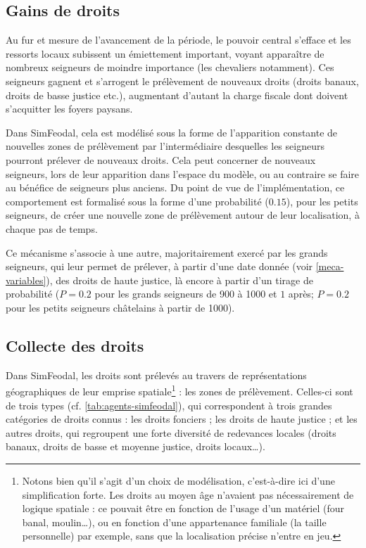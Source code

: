 \subsection{Gains de droits}

Au fur et mesure de l'avancement de la période, le pouvoir central s'efface et les ressorts locaux subissent un émiettement important, voyant apparaître de nombreux seigneurs de moindre importance (les chevaliers notamment).
Ces seigneurs gagnent et s'arrogent le prélèvement de nouveaux droits (droits banaux, droits de basse justice etc.), augmentant d'autant la charge fiscale dont doivent s'acquitter les foyers paysans.

Dans SimFeodal, cela est modélisé sous la forme de l'apparition constante de nouvelles zones de prélèvement par l'intermédiaire desquelles les seigneurs pourront prélever de nouveaux droits.
Cela peut concerner de nouveaux seigneurs, lors de leur apparition dans l'espace du modèle, ou au contraire se faire au bénéfice de seigneurs plus anciens.
Du point de vue de l'implémentation, ce comportement est formalisé sous la forme d'une probabilité ($0.15$), pour les petits seigneurs, de créer une nouvelle zone de prélèvement autour de leur localisation, à chaque pas de temps.

Ce mécanisme s'associe à une autre, majoritairement exercé par les grands seigneurs, qui leur permet de prélever, à partir d'une date donnée (voir \cref{meca-variables}), des droits de haute justice, là encore à partir d'un tirage de probabilité ($P = 0.2$ pour les grands seigneurs de 900 à 1000 et $1$ après; $P = 0.2$ pour les petits seigneurs châtelains à partir de 1000).

\subsection{Collecte des droits}

Dans SimFeodal, les droits sont prélevés au travers de représentations géographiques de leur emprise spatiale\footnote{
Notons bien qu'il s'agit d'un choix de modélisation, c'est-à-dire ici d'une simplification forte.
Les droits au moyen âge n'avaient pas nécessairement de logique spatiale : ce pouvait être en fonction de l'usage d'un matériel (four banal, moulin\ldots), ou en fonction d'une appartenance familiale (la \og taille\fg{} personnelle) par exemple, sans que la localisation précise n'entre en jeu.
} : les zones de prélèvement.
Celles-ci sont de trois types (cf. \cref{tab:agents-simfeodal}), qui correspondent à trois grandes catégories de droits connus : les droits fonciers ; les droits de haute justice ; et les autres droits, qui regroupent une forte diversité de redevances locales (droits banaux, droits de basse et moyenne justice, droits locaux\ldots).

